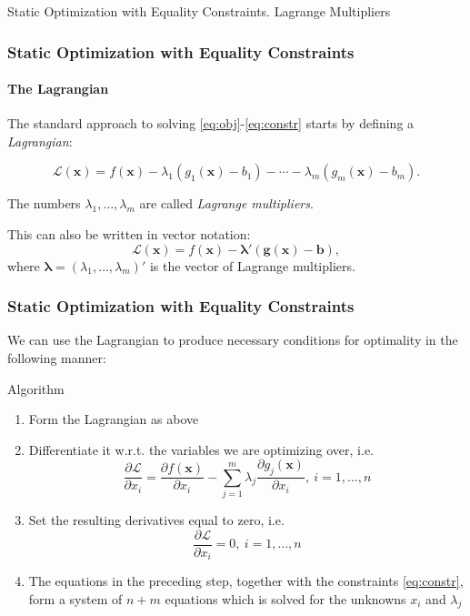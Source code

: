 \documentclass[10pt]{beamer}
\theoremstyle{definition}
\begin{document}
\begin{section}{Static Optimization with Equality Constraints. Lagrange Multipliers}
\begin{frame}[fragile]
\frametitle{Static Optimization with Equality Constraints}
\framesubtitle{The Lagrangian}
The standard approach to solving \eqref{eq:obj}-\eqref{eq:constr} starts by defining a \emph{Lagrangian}:

\[ \mathcal{L}(\mathbf{x}) = f(\mathbf{x}) - \lambda_1 (g_1(\mathbf{x})-b_1) - \cdots - \lambda_m (g_m(\mathbf{x})-b_m). \]\bigskip

The numbers $ \lambda_1,\ldots,\lambda_m $ are called \emph{Lagrange multipliers}.\bigskip

This can also be written in vector notation:
\[ \mathcal{L}(\mathbf{x}) = f(\mathbf{x}) - \boldsymbol{\lambda}' (\mathbf{g}(\mathbf{x})-\mathbf{b}) , \] 
where $ \boldsymbol{\lambda }= (\lambda_1,\ldots,\lambda_m)' $ is the vector of Lagrange multipliers.
\end{frame}

\begin{frame}[fragile]
\frametitle{Static Optimization with Equality Constraints}
We can use the Lagrangian to produce necessary conditions for optimality in the following manner:

\begin{block}{Algorithm}
\begin{enumerate}
\item Form the Lagrangian as above
\item Differentiate it w.r.t. the variables we are optimizing over, i.e.
\[ \dfrac{\partial \mathcal{L}}{\partial x_i} = \dfrac{\partial f(\mathbf{x})}{\partial x_i} - \sum_{j=1}^{m}\lambda_j \dfrac{\partial g_j(\mathbf{x})}{\partial x_i},~i=1,\ldots,n \]
\item Set the resulting derivatives equal to zero, i.e.
\[ \dfrac{\partial \mathcal{L}}{\partial x_i} = 0,~i=1,\ldots,n \]
\item The equations in the preceding step, together with the constraints \eqref{eq:constr}, form a system of $ n+m $ equations which is solved for the unknowns $ x_i $ and $ \lambda_j $
\end{enumerate}
\end{block}
\end{frame}


\end{section}
\end{document}
